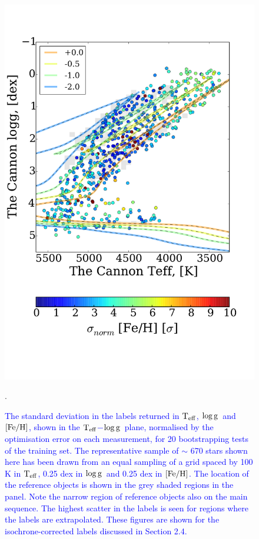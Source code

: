 \documentclass[12pt, preprint]{aastex}
\newcommand{\teff}{\mbox{$\rm T_{eff}$}}
\newcommand{\feh}{\mbox{$\rm [Fe/H]$}}
\newcommand{\logg}{\mbox{$\rm \log g$}}
\begin{document}
\begin{figure}[!h]
    \includegraphics[scale=0.26]{./plots/aftersubmit/stdtest_feh_normed.pdf}
    \caption{\textcolor{blue}{The standard deviation in the labels returned in \teff, \logg\ and \feh, shown in the \teff$-$\logg\ plane, normalised by the optimisation error on each measurement, for 20 bootstrapping tests of the training set. The representative sample of $\sim$ 670 stars shown here has been drawn from an equal sampling of a grid spaced by 100 K in \teff, 0.25 dex in \logg\ and 0.25 dex in \feh. The location of the reference objects is shown in the grey shaded regions in the panel. Note the narrow region of reference objects also on the main sequence. The highest scatter in the labels is seen for regions where the labels are extrapolated. These figures are shown for the isochrone-corrected labels discussed in Section 2.4.}}
    \label{fig:sigma}.
\end{figure}
\end{document}
